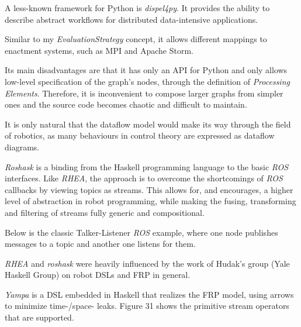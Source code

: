 \documentclass{dithesis}
\begin{document}

A less-known framework for Python is \textit{dispel4py}. It provides the ability to describe abstract workflows for distributed data-intensive applications.

Similar to my \textit{EvaluationStrategy} concept, it allows different mappings to enactment systems, such as MPI and Apache Storm.

Its main disadvantages are that it has only an API for Python and only allows low-level specification of the graph's nodes, through the definition of \textit{Processing Elements}. Therefore, it is inconvenient to compose larger graphs from simpler ones and the source code becomes chaotic and difficult to maintain.


It is only natural that the dataflow model would make its way through the field of robotics, as many behaviours in control theory are expressed as dataflow diagrams. 


\textit{Roshask}\cite{roshask} is a binding from the Haskell programming language to the basic \textit{ROS} interfaces. Like \textit{RHEA}, the approach is to overcome the shortcomings of \textit{ROS} callbacks by viewing topics as streams. This allows for, and encourages, a higher level of abstraction in robot programming, while making the fusing, transforming and filtering of streams fully generic and compositional. 

Below is the classic Talker-Listener \textit{ROS} example, where one node publishes messages to a topic and another one listens for them.



\textit{RHEA} and \textit{roshask} were heavily influenced by the work of Hudak's group (Yale Haskell Group) on robot DSLs and FRP in general\cite{fran, arrows_robots,lambda_in_motion,event_frp,real_frp,pushpull_frp}.

\textit{Yampa} is a DSL embedded in Haskell that realizes the FRP model, using arrows to minimize time-/space- leaks. Figure 31 shows the primitive stream operators that are supported. 
\end{document}
